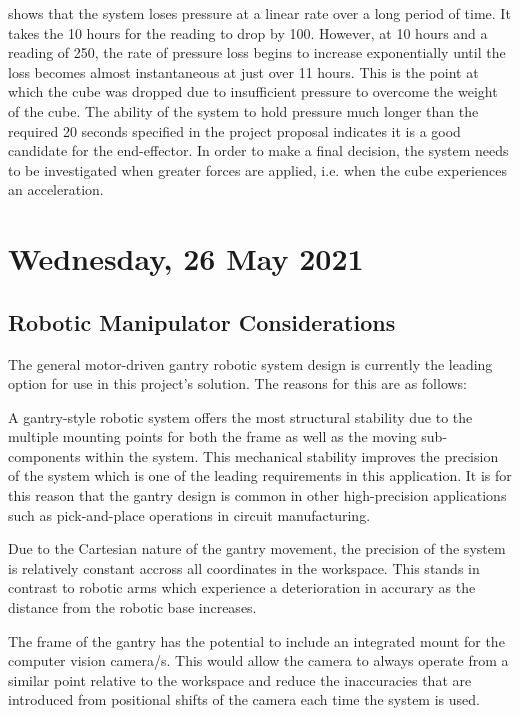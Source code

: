  shows that the system loses pressure at a linear rate over a long period of time. It takes the 10 hours for the reading to drop by 100. However, at 10 hours and a reading of 250, the rate of pressure loss begins to increase exponentially until the loss becomes almost instantaneous at just over 11 hours. This is the point at which the cube was dropped due to insufficient pressure to overcome the weight of the cube. The ability of the system to hold pressure much longer than the required 20 seconds specified in the project proposal indicates it is a good candidate for the end-effector. In order to make a final decision, the system needs to be investigated when greater forces are applied, i.e. when the cube experiences an acceleration.

\pendsign

\section[2021/05/26]{Wednesday, 26 May 2021}

\subsection{Robotic Manipulator Considerations}

The general motor-driven gantry robotic system design is currently the leading option for use in this project's solution. The reasons for this are as follows:

\begin{compactitem}
    \item A gantry-style robotic system offers the most structural stability due to the multiple mounting points for both the frame as well as the moving sub-components within the system. This mechanical stability improves the precision of the system which is one of the leading requirements in this application. It is for this reason that the gantry design is common in other high-precision applications such as pick-and-place operations in circuit manufacturing.
    \item Due to the Cartesian nature of the gantry movement, the precision of the system is relatively constant accross all coordinates in the workspace. This stands in contrast to robotic arms which experience a deterioration in accurary as the distance from the robotic base increases.
    \item The frame of the gantry has the potential to include an integrated mount for the computer vision camera/s. This would allow the camera to always operate from a similar point relative to the workspace and reduce the inaccuracies that are introduced from positional shifts of the camera each time the system is used.
\end{compactitem}

